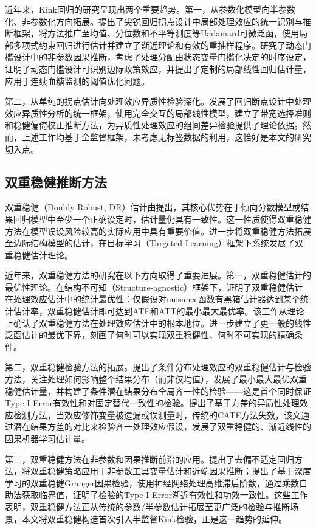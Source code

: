 \documentclass[12pt,a4paper]{ctexart}
\renewcommand*{\cite}{\supercite}
\begin{document}
近年来，Kink回归的研究呈现出两个重要趋势。第一，从参数化模型向半参数化、非参数化方向拓展。\cite{wang2025}提出了尖锐回归拐点设计中局部处理效应的统一识别与推断框架，将方法推广至均值、分位数和不平等测度等Hadamard可微泛函，使用局部多项式约束回归进行估计并建立了渐近理论和有效的重抽样程序。\cite{ghosh2025}研究了动态门槛设计中的非参数因果推断，考虑了处理分配由状态变量门槛化决定的时序设定，证明了动态门槛设计可识别边际政策效应，并提出了定制的局部线性回归估计量，应用于连续血糖监测的阈值优化问题。

第二，从单纯的拐点估计向处理效应异质性检验深化。\cite{calonico2025}发展了回归断点设计中处理效应异质性分析的统一框架，使用完全交互的局部线性模型，建立了带宽选择准则和稳健偏倚校正推断方法，为异质性处理效应的组间差异检验提供了理论依据。然而，上述工作均基于全监督框架，未考虑无标签数据的利用，这恰好是本文的研究切入点。

\subsection{双重稳健推断方法}

双重稳健（Doubly Robust, DR）估计由\cite{robins1994}提出，其核心优势在于倾向分数模型或结果回归模型中至少一个正确设定时，估计量仍具有一致性。这一性质使得双重稳健方法在模型误设风险较高的实际应用中具有重要价值。\cite{bang2005}进一步将双重稳健方法拓展至边际结构模型的估计，\cite{vanderlaan2011}在目标学习（Targeted Learning）框架下系统发展了双重稳健估计理论。

近年来，双重稳健方法的研究在以下方向取得了重要进展。第一，双重稳健估计的最优性理论。\cite{jin2024}在结构不可知（Structure-agnostic）框架下，证明了双重稳健估计在处理效应估计中的统计最优性：仅假设对nuisance函数有黑箱估计器达到某个统计估计率，双重稳健估计即可达到ATE和ATT的最小最大最优率。该工作从理论上确认了双重稳健方法在处理效应估计中的根本地位。\cite{jin2025}进一步建立了更一般的线性泛函估计的最优下界，刻画了何时可以实现双重稳健性、何时不可实现的精确条件。

第二，双重稳健检验方法的拓展。\cite{jain2026}提出了条件分布处理效应的双重稳健估计与检验方法，关注处理如何影响整个结果分布（而非仅均值），发展了最小最大最优双重稳健估计量，并构建了条件潜在结果分布全局齐一性的检验——这是首个同时保证Type I Error有效性和对固定替代一致性的检验。\cite{boileau2025}提出了基于方差的异质性处理效应检测方法，当效应修饰变量被遗漏或误测量时，传统的CATE方法失效，该文通过潜在结果方差的对比来检验齐一处理效应假设，发展了双重稳健的、渐近线性的因果机器学习估计量。

第三，双重稳健方法在非参数和因果推断前沿的应用。\cite{ghassami2025}提出了去偏不适定回归方法，将双重稳健策略应用于非参数工具变量估计和近端因果推断；\cite{hui2025}提出了基于深度学习的双重稳健Granger因果检验，使用神经网络处理高维滞后阶数，通过乘数自助法获取临界值，证明了检验的Type I Error渐近有效性和功效一致性。这些工作表明，双重稳健方法正从传统的参数/半参数估计拓展至更广泛的检验与推断场景，本文将双重稳健构造首次引入半监督Kink检验，正是这一趋势的延伸。
\end{document}
